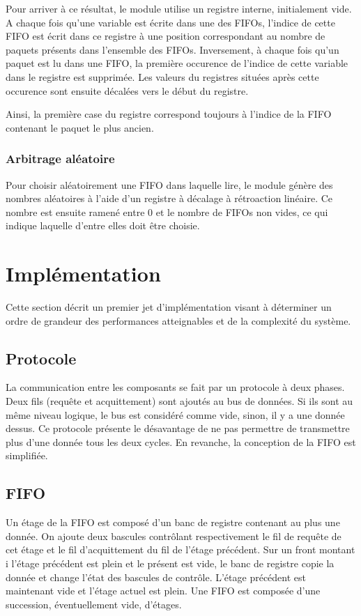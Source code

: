 \documentclass[11pt]{article}
\begin{document}
Pour arriver à ce résultat, le module utilise un registre interne, initialement vide.
A chaque fois qu'une variable est écrite dans une des FIFOs, l'indice de cette FIFO est écrit dans ce registre
à une position correspondant au nombre de paquets présents dans l'ensemble des FIFOs.
Inversement, à chaque fois qu'un paquet est lu dans une FIFO, la première occurence de l'indice de cette
variable dans le registre est supprimée. Les valeurs du registres situées après cette occurence sont ensuite décalées vers le début du registre.

Ainsi, la première case du registre correspond toujours à l'indice de la FIFO contenant le paquet le plus ancien.

\subsubsection{Arbitrage aléatoire}
Pour choisir aléatoirement une FIFO dans laquelle lire, le module génère des nombres aléatoires
à l'aide d'un registre à décalage à rétroaction linéaire.
Ce nombre est ensuite ramené entre 0 et le nombre de FIFOs non vides, ce qui indique laquelle d'entre elles doit être choisie.

\section{Implémentation}

Cette section décrit un premier jet d'implémentation visant à déterminer un ordre de grandeur des performances atteignables et de la complexité du système.

\subsection{Protocole}
La communication entre les composants se fait par un protocole à deux phases. Deux fils (requête et acquittement) sont ajoutés au bus de données. Si ils sont au même niveau logique, le bus est considéré comme vide, sinon, il y a une donnée dessus. Ce protocole présente le désavantage de ne pas permettre de transmettre plus d'une donnée tous les deux cycles. En revanche, la conception de la FIFO est simplifiée.

\subsection{FIFO}
Un étage de la FIFO est composé d'un banc de registre contenant au plus une donnée. On ajoute deux bascules contrôlant respectivement le fil de requête de cet étage et le fil d'acquittement du fil de l'étage précédent. Sur un front montant i l'étage précédent est plein et le présent est vide, le banc de registre copie la donnée et change l'état des bascules de contrôle. L'étage précédent est maintenant vide et l'étage actuel est plein.
Une FIFO est composée d'une succession, éventuellement vide, d'étages.
\end{document}

